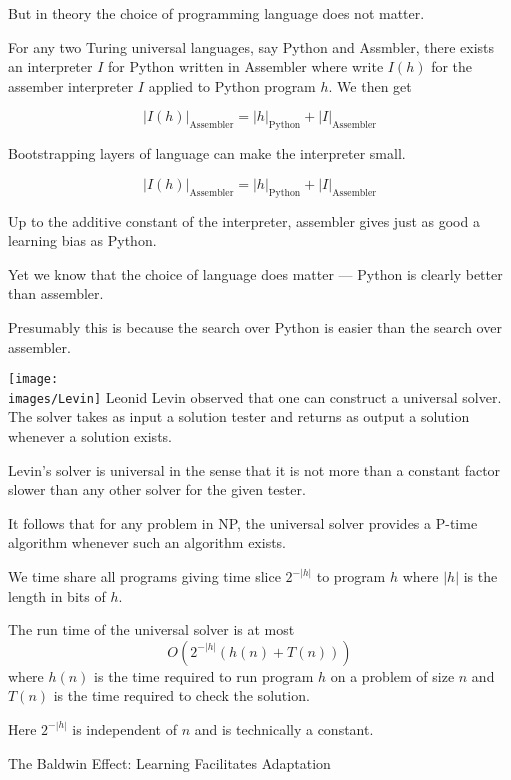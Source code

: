 {But in theory the choice of programming language does not matter.

\vfill
For any two Turing universal languages, say Python and Assmbler, there exists an interpreter $I$ for Python written in Assembler
where write $I(h)$ for the assember interpreter $I$ applied to Python program $h$.  We then get

$$|I(h)|_\mathrm{Assembler} = |h|_\mathrm{Python} + |I|_\mathrm{Assembler}$$

\vfill
Bootstrapping layers of language can make the interpreter small.


$$|I(h)|_\mathrm{Assembler} = |h|_\mathrm{Python} + |I|_\mathrm{Assembler}$$

\vfill
Up to the additive constant of the interpreter, assembler gives just as good a learning bias as Python.

\vfill
Yet we know that the choice of language does matter --- Python is clearly better than assembler.

\vfill
Presumably this is because the search over Python is easier than the search over assembler.


\texttt{[image: \\images/Levin]}
Leonid Levin observed that one can construct a universal solver.  The solver takes as input a solution tester
and returns as output a solution whenever a solution exists.

  \vfill
Levin's solver is universal in the sense that it is not more than a constant factor slower than any other solver for the given tester.

\vfill
It follows that for any problem in NP, the universal solver provides a P-time algorithm whenever such an algorithm exists.


  
\vfill
We time share all programs giving time slice $2^{-|h|}$ to program $h$ where $|h|$
is the length in bits of $h$.

\vfill
The run time of the universal solver is at most
$$O(2^{-|h|}(h(n) + T(n)))$$
where $h(n)$ is the time required to run program $h$ on a problem of size $n$ and $T(n)$ is the time required to check the solution.

\vfill
Here $2^{-|h|}$ is independent of $n$ and is technically a constant.

{The Baldwin Effect: Learning Facilitates Adaptation}

}
